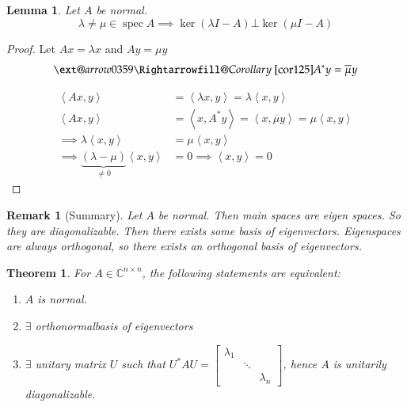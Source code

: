 \documentclass{article}
\makeatletter
\newtheorem{theorem}{Theorem}  \numberwithin{theorem}{section}
\newtheorem{lemma}{Lemma}  \numberwithin{lemma}{section}
\newtheorem{remark}{Remark}  \numberwithin{remark}{section}
\newcommand{\angel}[1]{\left\langle#1\right\rangle}
\newcommand{\xRightarrow}[2][]{\ext@arrow 0359\Rightarrowfill@{#1}{#2}}
\makeatother
\begin{document}
\begin{lemma} %
  Let $A$ be normal.
  \[ \lambda \neq \mu \in \operatorname{spec}{A} \implies \ker(\lambda I - A) \bot \ker(\mu I - A) \]
\end{lemma}

\begin{proof}
  Let $Ax = \lambda x$ and $Ay = \mu y$
  \[ \xRightarrow{Corollary~\ref{cor125}} A^* y = \overline{\mu} y \]

  \begin{align*}
    \angel{Ax,y} &= \angel{\lambda x, y} = \lambda \angel{x,y} \\
    \angel{Ax,y} &= \angel{x, A^* y} = \angel{x, \overline{\mu} y} = \mu \angel{x,y} \\
    \implies \lambda \angel{x,y} &= \mu \angel{x,y} \\
    \implies \underbrace{(\lambda - \mu)}_{\neq 0} \angel{x,y} &= 0 \implies \angel{x,y} = 0
  \end{align*}
\end{proof}

\begin{remark}[Summary]
  Let $A$ be normal. Then main spaces are eigen spaces.
  So they are diagonalizable. Then there exists some basis of eigenvectors.
  Eigenspaces are always orthogonal, so there exists an orthogonal basis of eigenvectors.
\end{remark}

\begin{theorem} %
  For $A \in \mathbb C^{n \times n}$, the following statements are equivalent:
  \begin{enumerate}
    \item $A$ is normal.
    \item $\exists$ orthonormalbasis of eigenvectors
    \item $\exists$ unitary matrix $U$ such that $U^* AU = \begin{bmatrix} \lambda_1 & & \\ & \ddots & \\ & & \lambda_n \end{bmatrix}$,
      hence $A$ is unitarily diagonalizable.
  \end{enumerate}
\end{theorem}
\end{document}
